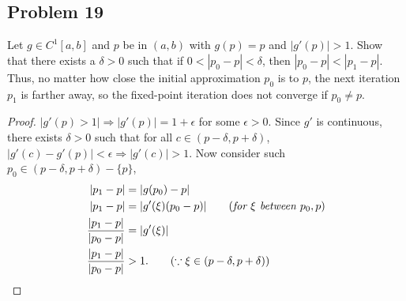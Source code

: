 \documentclass{article}
\begin{document}
\subsection*{Problem 19}
Let $g\in C^1[a,b]$ and $p$ be in $(a,b)$ with $g(p)=p$ and $|g'(p)|>1$. Show that there exists a 
$\delta > 0$ such that if $0<|p_0-p|<\delta$, then $|p_0-p|<|p_1-p|$. Thus, no matter how close the 
initial approximation $p_0$ is to $p$, the next iteration $p_1$ is farther away, so the fixed-point 
iteration does not converge if $p_0\neq p$.
\begin{proof}
    $|g'(p)>1|\Rightarrow |g'(p)| = 1 + \epsilon$ for some $\epsilon>0$. Since $g'$ is continuous, 
    there exists $\delta > 0$ such that for all $c\in(p-\delta,p+\delta)$, $|g'(c) - g'(p)| < 
    \epsilon\Rightarrow |g'(c)| > 1$. Now consider such $p_0\in(p-\delta, p+\delta)-\{p\}$,
    \begin{align*}
        |p_1-p| & = |g(p_0)-p| \\
        |p_1-p| & = |g'(\xi)(p_0 - p)| \qquad (\emph{for $\xi$ between }p_0, p) \\
        \frac{|p_1-p|}{|p_0-p|} & = |g'(\xi)| \\ 
        \frac{|p_1-p|}{|p_0-p|} & > 1. \qquad (\because \xi \in (p-\delta, p+\delta))
    \end{align*}
    
\end{proof}
\end{document}
